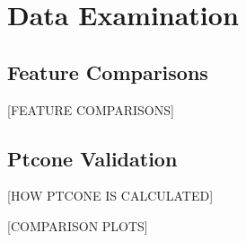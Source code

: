 \section{Data Examination}\label{sec:dataexamination}

\subsection{Feature Comparisons}

[FEATURE COMPARISONS]

\subsection{Ptcone Validation}

[HOW PTCONE IS CALCULATED]

[COMPARISON PLOTS]